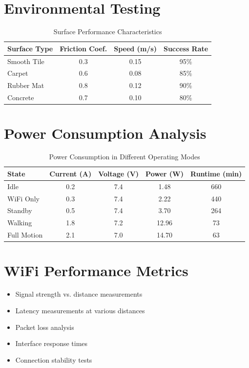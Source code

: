 \documentclass[12pt,a4paper]{report}
\begin{document}
\section{Environmental Testing}
\begin{table}[h]
\centering
\begin{tabular}{|l|c|c|c|}
\hline
\textbf{Surface Type} & \textbf{Friction Coef.} & \textbf{Speed (m/s)} & \textbf{Success Rate} \\
\hline
Smooth Tile & 0.3 & 0.15 & 95\% \\
Carpet & 0.6 & 0.08 & 85\% \\
Rubber Mat & 0.8 & 0.12 & 90\% \\
Concrete & 0.7 & 0.10 & 80\% \\
\hline
\end{tabular}
\caption{Surface Performance Characteristics}
\end{table}

\section{Power Consumption Analysis}
\begin{table}[h]
\centering
\begin{tabular}{|l|c|c|c|c|}
\hline
\textbf{State} & \textbf{Current (A)} & \textbf{Voltage (V)} & \textbf{Power (W)} & \textbf{Runtime (min)} \\
\hline
Idle & 0.2 & 7.4 & 1.48 & 660 \\
WiFi Only & 0.3 & 7.4 & 2.22 & 440 \\
Standby & 0.5 & 7.4 & 3.70 & 264 \\
Walking & 1.8 & 7.2 & 12.96 & 73 \\
Full Motion & 2.1 & 7.0 & 14.70 & 63 \\
\hline
\end{tabular}
\caption{Power Consumption in Different Operating Modes}
\end{table}
\section{WiFi Performance Metrics}
\begin{itemize}
\item Signal strength vs. distance measurements
\item Latency measurements at various distances
\item Packet loss analysis
\item Interface response times
\item Connection stability tests
\end{itemize}
\end{document}
